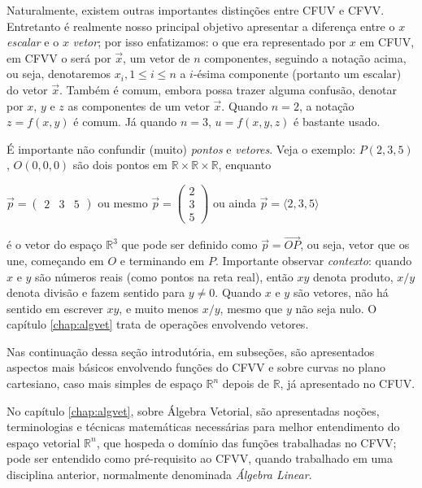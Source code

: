Naturalmente, existem outras importantes distinções entre CFUV e CFVV. Entretanto é realmente nosso principal objetivo apresentar a diferença entre o $x$ {\it escalar} e o $x$ {\it vetor}; por isso 
enfatizamos: o que era representado por $x$ em CFUV, em CFVV o será por $\vec{x}$, um vetor de $n$ componentes, seguindo a notação acima, ou seja, denotaremos $x_i, 1 \leq i \leq n$ a $i$-ésima componente (portanto um escalar) do vetor $\vec{x}$. 
Também é comum, embora possa trazer alguma confusão, denotar por $x$, $y$ e $z$ as componentes de um vetor $\vec{x}$. Quando $n=2$, a notação $z=f(x,y)$ é comum. Já quando $n=3$, $u = f(x,y,z)$  é bastante usado.


É importante  não confundir (muito) {\it pontos} e {\it vetores}. Veja o exemplo: $P(2,3,5)$, $O(0,0,0)$ são dois pontos em $\mathbb{R} \times \mathbb{R} \times \mathbb{R}$, enquanto 
\begin{center}
$\displaystyle \vec{p} = \left( \begin{array}{ccc}
2 & 3 & 5 \end{array} \right)$ ou mesmo
$\displaystyle \vec{p} = \left( \begin{array}{c}
2 \\ 3 \\ 5 \end{array} \right) $ ou ainda
$\displaystyle \vec{p} = \langle 2, 3, 5 \rangle$ 
\end{center}
é o vetor do espaço $\mathbb{R}^3$ que pode ser definido como $\vec{p} = \stackrel{\longrightarrow}{OP}$, ou seja, vetor que os une, começando em $O$ e terminando em  $P$. Importante observar {\it contexto}: quando $x$ e $y$ são números reais (como pontos na reta real), então $xy$ denota produto, $x/y$ denota divisão e fazem sentido para $y \neq 0$. Quando $x$ e $y$ são vetores, não há sentido em escrever $xy$, e muito menos $x/y$, mesmo que $y$ não seja nulo. O capítulo \ref{chap:algvet} trata de operações envolvendo vetores.

Nas continuação dessa seção introdutória, em subseções,  são apresentados aspectos mais básicos envolvendo funções do CFVV e sobre curvas no plano cartesiano, caso mais simples de espaço $\mathbb{R}^n$ depois de $\mathbb{R}$, já apresentado no CFUV.

No capítulo \ref{chap:algvet}, sobre Álgebra Vetorial, são apresentadas noções, terminologias e técnicas matemáticas necessárias para melhor entendimento do espaço vetorial $\mathbb{R}^n$, que hospeda o domínio das funções trabalhadas no CFVV;
pode ser entendido como pré-requisito ao CFVV, quando trabalhado em uma disciplina anterior, normalmente denominada {\it Álgebra Linear}.

